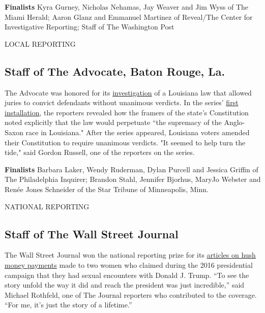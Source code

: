 \textbf{Finalists} Kyra Gurney, Nicholas Nehamas, Jay Weaver and Jim
Wyss of The Miami Herald; Aaron Glanz and Emmanuel Martinez of
Reveal/The Center for Investigative Reporting; Staff of The Washington
Post

LOCAL REPORTING

\hypertarget{staff-of-the-advocate-baton-rouge-la}{%
\subsection{Staff of The Advocate, Baton Rouge,
La.}\label{staff-of-the-advocate-baton-rouge-la}}

The Advocate was honored for its
\href{https://www.theadvocate.com/new_orleans/news/courts/article_a03f02d2-fcf5-11e8-937c-fb85ceb6d9d3.html}{investigation}
of a Louisiana law that allowed juries to convict defendants without
unanimous verdicts. In the series'
\href{https://www.theadvocate.com/new_orleans/news/courts/article_16fd0ece-32b1-11e8-8770-33eca2a325de.html}{first
installation}, the reporters revealed how the framers of the state's
Constitution noted explicitly that the law would perpetuate ``the
supremacy of the Anglo-Saxon race in Louisiana." After the series
appeared, Louisiana voters amended their Constitution to require
unanimous verdicts. "It seemed to help turn the tide," said Gordon
Russell, one of the reporters on the series.

\textbf{Finalists} Barbara Laker, Wendy Ruderman, Dylan Purcell and
Jessica Griffin of The Philadelphia Inquirer; Brandon Stahl, Jennifer
Bjorhus, MaryJo Webster and Renée Jones Schneider of the Star Tribune of
Minneapolis, Minn.

NATIONAL REPORTING

\hypertarget{staff-of-the-wall-street-journal}{%
\subsection{Staff of The Wall Street
Journal}\label{staff-of-the-wall-street-journal}}

The Wall Street Journal won the national reporting prize for its
\href{https://www.wsj.com/articles/trumps-hush-money-11545349433?mod=article_inline}{articles
on hush money payments} made to two women who claimed during the 2016
presidential campaign that they had sexual encounters with Donald J.
Trump. ``To see the story unfold the way it did and reach the president
was just incredible,'' said Michael Rothfeld, one of The Journal
reporters who contributed to the coverage. ``For me, it's just the story
of a lifetime.''

